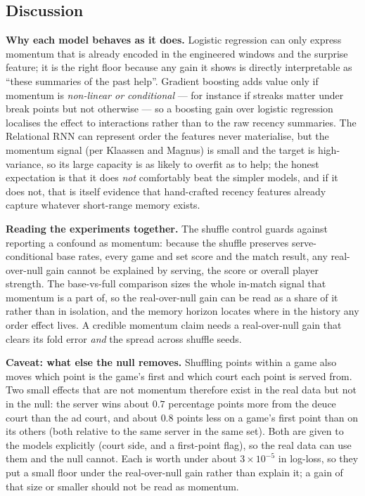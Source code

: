 \documentclass[10pt,a4paper]{article}
\begin{document}
\subsection{Discussion}
\textbf{Why each model behaves as it does.} Logistic regression can only express
momentum that is already encoded in the engineered windows and the surprise
feature; it is the right floor because any gain it shows is directly
interpretable as ``these summaries of the past help''. Gradient boosting adds
value only if momentum is \emph{non-linear or conditional} --- for instance if
streaks matter under break points but not otherwise --- so a boosting gain over
logistic regression localises the effect to interactions rather than to the raw
recency summaries. The Relational RNN can represent order the features never
materialise, but the momentum signal (per Klaassen and Magnus) is small and the
target is high-variance, so its large capacity is as likely to overfit as to
help; the honest expectation is that it does \emph{not} comfortably beat the
simpler models, and if it does not, that is itself evidence that hand-crafted
recency features already capture whatever short-range memory exists.

\textbf{Reading the experiments together.} The shuffle control guards against
reporting a confound as momentum: because the shuffle preserves serve-conditional
base rates, every game and set score and the match result, any real-over-null
gain cannot be explained by serving, the score or overall player strength. The
base-vs-full comparison sizes the whole in-match signal that momentum is a part
of, so the real-over-null gain can be read as a share of it rather than in
isolation, and the memory horizon locates where in the history any order effect
lives. A credible momentum claim needs a real-over-null gain that clears its
fold error \emph{and} the spread across shuffle seeds.

\textbf{Caveat: what else the null removes.} Shuffling points within a game also
moves which point is the game's first and which court each point is served
from. Two small effects that are not momentum therefore exist in the real data
but not in the null: the server wins about $0.7$ percentage points more from
the deuce court than the ad court, and about $0.8$ points less on a game's
first point than on its others (both relative to the same server in the same
set). Both are given to the models explicitly (court side, and a first-point
flag), so the real data can use them and the null cannot. Each is worth under
about $3\times10^{-5}$ in log-loss, so they put a small floor under the
real-over-null gain rather than explain it; a gain of that size or smaller
should not be read as momentum.
\end{document}
